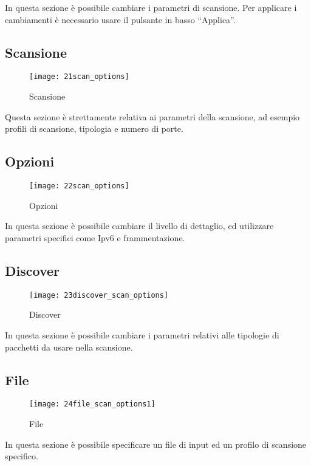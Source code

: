 In questa sezione \`e possibile cambiare i parametri di scansione. Per applicare 
i cambiamenti \`e necessario usare il pulsante in basso ``Applica''.

\subsection{Scansione}
\label{sec:ScanParameters}

\begin{figure}[h]
  \centering
  \texttt{[image: 21scan\_options]}
  \caption{Scansione}
  \label{fig:ScanParameters}
\end{figure}
Questa sezione \`e strettamente relativa ai parametri della scansione, ad 
esempio profili di scansione, tipologia e numero di porte.

\subsection{Opzioni}
\label{sec:ScanParamOptions}

\begin{figure}[h]
  \centering
  \texttt{[image: 22scan\_options]}
  \caption{Opzioni}
  \label{fig:ScanParamOptions}
\end{figure}
In questa sezione \`e possibile cambiare il livello di dettaglio, ed utilizzare 
parametri specifici come Ipv6 e frammentazione.

\subsection{Discover}
\label{sec:ScanDiscover}

\begin{figure}[h]
  \centering
  \texttt{[image: 23discover\_scan\_options]}
  \caption{Discover}
  \label{fig:ScanDiscover}
\end{figure}
In questa sezione \`e possibile cambiare i parametri relativi alle tipologie di 
pacchetti da usare nella scansione.

\subsection{File}
\label{sec:ScanFile}

\begin{figure}[h]
  \centering
  \texttt{[image: 24file\_scan\_options1]}
  \caption{File}
  \label{fig:ScanFile}
\end{figure}
In questa sezione \`e possibile specificare un file di input ed un profilo 
di scansione specifico.

